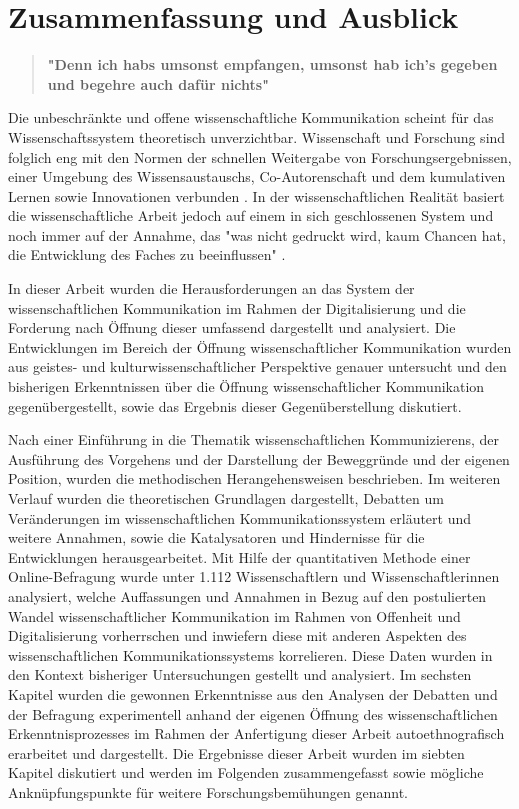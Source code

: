 \chapter{Zusammenfassung und Ausblick}

\begin{quote}
\textbf{"Denn ich habs umsonst empfangen, umsonst hab ich's gegeben und begehre auch dafür nichts"}
\end{quote} \cite{luther_1876}

Die unbeschränkte und offene wissenschaftliche Kommunikation scheint für das Wissenschaftssystem theoretisch unverzichtbar. Wissenschaft und Forschung sind folglich eng mit den Normen der schnellen Weitergabe von Forschungsergebnissen, einer Umgebung des Wissensaustauschs, Co-Autorenschaft und dem kumulativen Lernen sowie Innovationen verbunden \cite{Partha_1994_economics_science}. In der wissenschaftlichen Realität basiert die wissenschaftliche Arbeit jedoch auf einem in sich geschlossenen System und noch immer auf der Annahme, das "was nicht gedruckt wird, kaum Chancen hat, die Entwicklung des Faches zu beeinflussen" \cite{luhmann_1997_gesellschaft}.

In dieser Arbeit wurden die Herausforderungen an das System der wissenschaftlichen Kommunikation im Rahmen der Digitalisierung und die Forderung nach Öffnung dieser umfassend dargestellt und analysiert. Die Entwicklungen im Bereich der Öffnung wissenschaftlicher Kommunikation wurden aus geistes- und kulturwissenschaftlicher Perspektive genauer untersucht und den bisherigen Erkenntnissen über die Öffnung wissenschaftlicher Kommunikation gegenübergestellt, sowie das Ergebnis dieser Gegenüberstellung diskutiert.

Nach einer Einführung in die Thematik wissenschaftlichen Kommunizierens, der Ausführung des Vorgehens und der Darstellung der Beweggründe und der eigenen Position, wurden die methodischen Herangehensweisen beschrieben. Im weiteren Verlauf wurden die theoretischen Grundlagen dargestellt, Debatten um Veränderungen im wissenschaftlichen Kommunikationssystem erläutert und weitere Annahmen, sowie die Katalysatoren und Hindernisse für die Entwicklungen herausgearbeitet. Mit Hilfe der quantitativen Methode einer Online-Befragung wurde unter 1.112 Wissenschaftlern und Wissenschaftlerinnen analysiert, welche Auffassungen und Annahmen in Bezug auf den postulierten Wandel wissenschaftlicher Kommunikation im Rahmen von Offenheit und Digitalisierung vorherrschen und inwiefern diese mit anderen Aspekten des wissenschaftlichen Kommunikationssystems korrelieren. Diese Daten wurden in den Kontext bisheriger Untersuchungen gestellt und analysiert. Im sechsten Kapitel wurden die gewonnen Erkenntnisse aus den Analysen der Debatten und der Befragung experimentell anhand der eigenen Öffnung des wissenschaftlichen Erkenntnisprozesses im Rahmen der Anfertigung dieser Arbeit autoethnografisch erarbeitet und dargestellt. Die Ergebnisse dieser Arbeit wurden im siebten Kapitel diskutiert und werden im Folgenden zusammengefasst sowie mögliche Anknüpfungspunkte für weitere Forschungsbemühungen genannt.

